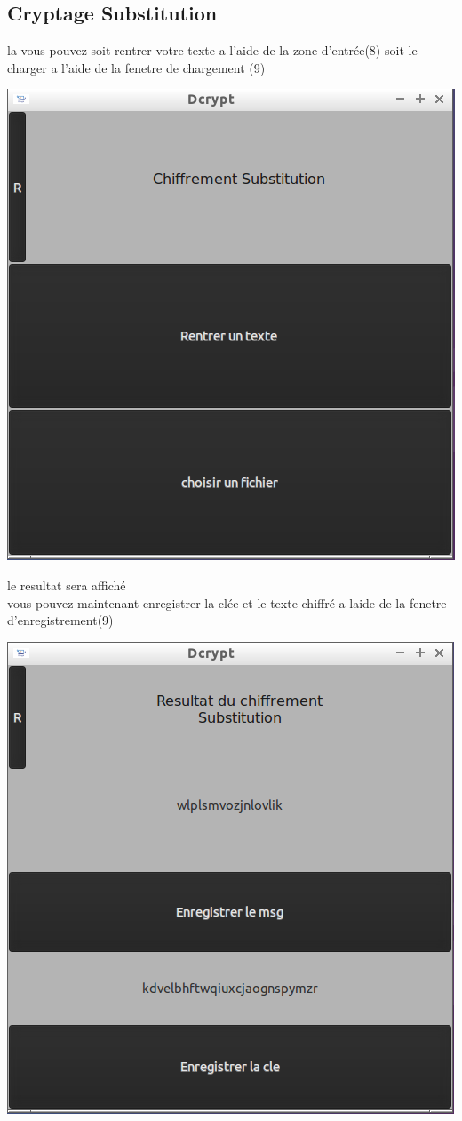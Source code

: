 \documentclass[a4]{article}
\begin{document}
		\subsection{Cryptage Substitution}
			la vous pouvez soit rentrer votre texte a l'aide de la zone d'entrée(8)
			soit le charger a l'aide de la fenetre de chargement (9)
			\begin{center}\includegraphics[scale=0.4]{3.png}\end{center}
			le resultat sera affiché \\
			vous pouvez maintenant enregistrer la clée et le texte chiffré a laide 
			de la fenetre d'enregistrement(9)
			\begin{center}\includegraphics[scale=0.4]{5.png}\end{center}
\end{document}
